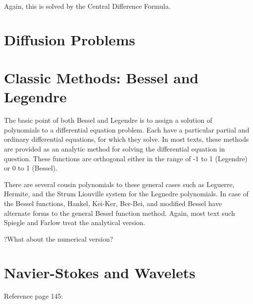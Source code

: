 \documentclass[11pt]{article}
\begin{document}
Again, this is solved by the Central Difference Formula. 


\section {Diffusion Problems}


\section{ Classic Methods: Bessel and Legendre}
The basic point of both Bessel and Legendre is to assign a solution of polynomials to a differential equation problem.  Each have a particular partial and ordinary differential equations, for which they solve.  In most texts, these methods are provided as an analytic method for solving the differential equation in question.  These functions are orthogonal either in the range of -1 to 1 (Legendre) or 0 to 1 (Bessel).  

There are several cousin polynomials to these general cases such as Leguerre, Hermite, and the Strum Liouville system for the Legnedre polynomials.  In case of the Bessel functions, Hankel, Kei-Ker, Ber-Bei, and modified Bessel have alternate forms to the general Bessel function method.  Again, most text such Spiegle and Farlow treat the analytical version.  

?What about the numerical version?

\section {Navier-Stokes and Wavelets} 
Reference page 145: 
\end{document}
